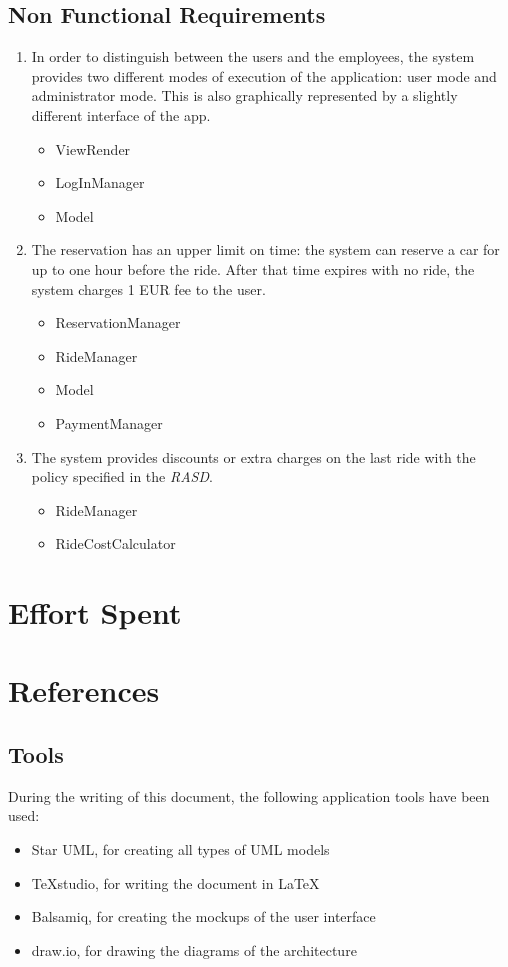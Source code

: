 \documentclass[11pt,a4paper]{report}
\begin{document}
\section{Non Functional Requirements}
\begin{enumerate}
	\item In order to distinguish between the users and the employees, the system provides two different modes of execution of the application: user mode and administrator mode. This is also graphically represented by a slightly different interface of the app.
	\begin{itemize}
		\item ViewRender
		\item LogInManager
		\item Model
	\end{itemize}
	\item The reservation has an upper limit on time: the system can reserve a car for up to one hour before the ride. After that time expires with no ride, the system charges 1 EUR fee to the user.
	\begin{itemize}
		\item ReservationManager
		\item RideManager
		\item Model
		\item PaymentManager
	\end{itemize}
	\item The system provides discounts or extra charges on the last ride with the policy specified in the \textit{RASD}.
	\begin{itemize}
		\item RideManager
		\item RideCostCalculator
	\end{itemize}
\end{enumerate}
\chapter{Effort Spent}
\chapter{References}
\section{Tools}
During the writing of this document, the following application tools have been used:
\begin{itemize}
	\item Star UML, for creating all types of UML models
	\item TeXstudio, for writing the document in \LaTeX
	\item Balsamiq, for creating the mockups of the user interface
	\item draw.io, for drawing the diagrams of the architecture
\end{itemize}
\end{document}

